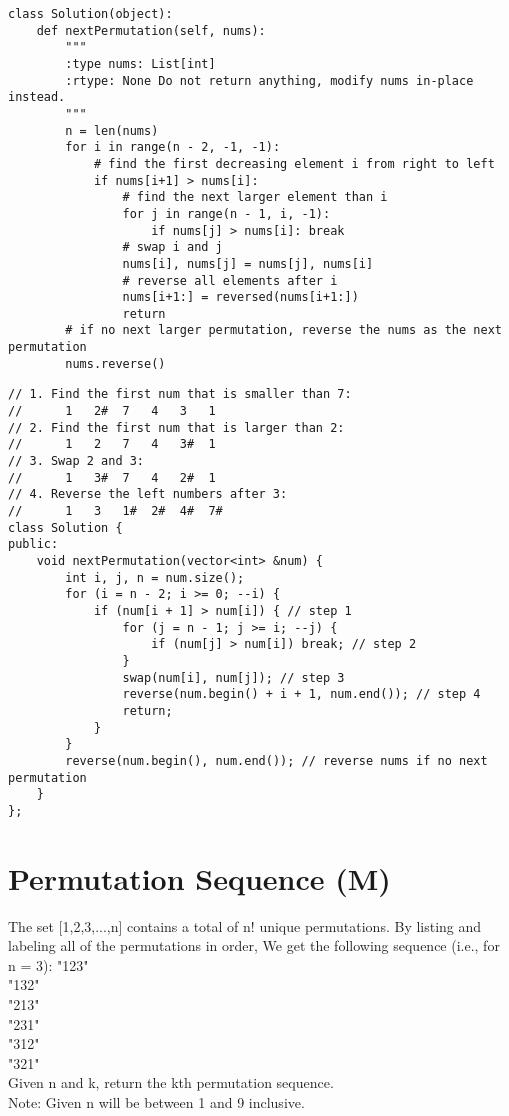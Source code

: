 \begin{lstlisting}
class Solution(object):
    def nextPermutation(self, nums):
        """
        :type nums: List[int]
        :rtype: None Do not return anything, modify nums in-place instead.
        """
        n = len(nums)
        for i in range(n - 2, -1, -1):
            # find the first decreasing element i from right to left
            if nums[i+1] > nums[i]:
                # find the next larger element than i
                for j in range(n - 1, i, -1):
                    if nums[j] > nums[i]: break
                # swap i and j
                nums[i], nums[j] = nums[j], nums[i]
                # reverse all elements after i
                nums[i+1:] = reversed(nums[i+1:])   
                return
        # if no next larger permutation, reverse the nums as the next permutation
        nums.reverse()            
\end{lstlisting}

\begin{lstlisting}
// 1. Find the first num that is smaller than 7:
//      1   2#  7   4   3   1
// 2. Find the first num that is larger than 2:
//      1   2   7   4   3#  1
// 3. Swap 2 and 3:
//      1   3#  7   4   2#  1
// 4. Reverse the left numbers after 3: 
//      1   3   1#  2#  4#  7#
class Solution {
public:
    void nextPermutation(vector<int> &num) {
        int i, j, n = num.size();
        for (i = n - 2; i >= 0; --i) {
            if (num[i + 1] > num[i]) { // step 1
                for (j = n - 1; j >= i; --j) {
                    if (num[j] > num[i]) break; // step 2
                }
                swap(num[i], num[j]); // step 3
                reverse(num.begin() + i + 1, num.end()); // step 4
                return;
            }
        }
        reverse(num.begin(), num.end()); // reverse nums if no next permutation
    }
};
\end{lstlisting}


\section{Permutation Sequence (M)}
The set [1,2,3,...,n] contains a total of n! unique permutations. By listing and labeling all of the permutations in order, We get the following sequence (i.e., for n = 3):
    "123"\\
    "132"\\
    "213"\\
    "231"\\
    "312"\\
    "321"\\
Given n and k, return the kth permutation sequence.\\
Note: Given n will be between 1 and 9 inclusive.\\

